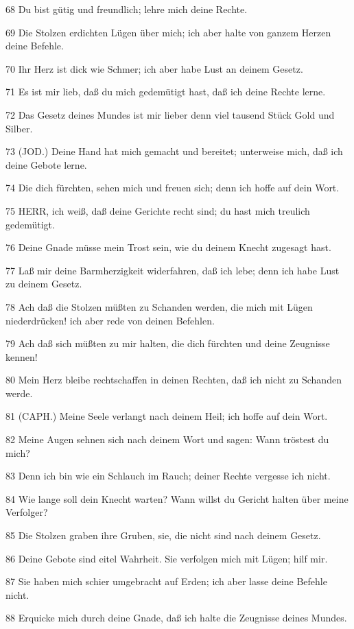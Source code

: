 \par 68 Du bist gütig und freundlich; lehre mich deine Rechte.
\par 69 Die Stolzen erdichten Lügen über mich; ich aber halte von ganzem Herzen deine Befehle.
\par 70 Ihr Herz ist dick wie Schmer; ich aber habe Lust an deinem Gesetz.
\par 71 Es ist mir lieb, daß du mich gedemütigt hast, daß ich deine Rechte lerne.
\par 72 Das Gesetz deines Mundes ist mir lieber denn viel tausend Stück Gold und Silber.
\par 73 (JOD.) Deine Hand hat mich gemacht und bereitet; unterweise mich, daß ich deine Gebote lerne.
\par 74 Die dich fürchten, sehen mich und freuen sich; denn ich hoffe auf dein Wort.
\par 75 HERR, ich weiß, daß deine Gerichte recht sind; du hast mich treulich gedemütigt.
\par 76 Deine Gnade müsse mein Trost sein, wie du deinem Knecht zugesagt hast.
\par 77 Laß mir deine Barmherzigkeit widerfahren, daß ich lebe; denn ich habe Lust zu deinem Gesetz.
\par 78 Ach daß die Stolzen müßten zu Schanden werden, die mich mit Lügen niederdrücken! ich aber rede von deinen Befehlen.
\par 79 Ach daß sich müßten zu mir halten, die dich fürchten und deine Zeugnisse kennen!
\par 80 Mein Herz bleibe rechtschaffen in deinen Rechten, daß ich nicht zu Schanden werde.
\par 81 (CAPH.) Meine Seele verlangt nach deinem Heil; ich hoffe auf dein Wort.
\par 82 Meine Augen sehnen sich nach deinem Wort und sagen: Wann tröstest du mich?
\par 83 Denn ich bin wie ein Schlauch im Rauch; deiner Rechte vergesse ich nicht.
\par 84 Wie lange soll dein Knecht warten? Wann willst du Gericht halten über meine Verfolger?
\par 85 Die Stolzen graben ihre Gruben, sie, die nicht sind nach deinem Gesetz.
\par 86 Deine Gebote sind eitel Wahrheit. Sie verfolgen mich mit Lügen; hilf mir.
\par 87 Sie haben mich schier umgebracht auf Erden; ich aber lasse deine Befehle nicht.
\par 88 Erquicke mich durch deine Gnade, daß ich halte die Zeugnisse deines Mundes.
